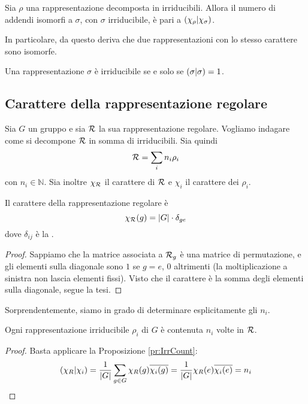 \begin{myprop}\label{pr:IrrCount}
  Sia $\rho$ una rappresentazione decomposta in irriducibili. Allora il numero di addendi isomorfi a $\sigma$, con $\sigma$ irriducibile, è pari a $\left(\chi_\rho | \chi_\sigma\right)$.
\end{myprop}

In particolare, da questo deriva che due rappresentazioni con lo stesso carattere sono isomorfe.

\begin{mytheorem}
  Una rappresentazione $\sigma$ è irriducibile se e solo se $\left(\sigma | \sigma\right)=1$.
\end{mytheorem}

\subsection{Carattere della rappresentazione regolare}
Sia $G$ un gruppo e sia $\mathcal R$ la sua rappresentazione regolare. Vogliamo indagare come si decompone $\mathcal R$ in somma di irriducibili. Sia quindi
\[
  \mathcal R = \sum_i n_i \rho_i
\]
con $n_i \in \mathbb N$. Sia inoltre $\chi_\mathcal R$ il carattere di $\mathcal R$ e $\chi_i$ il carattere dei $\rho_i$.
  
\begin{myprop}
  Il carattere della rappresentazione regolare è
  \[
  \chi_\mathcal R(g) = \left|G\right| \cdot \delta_{ge}
  \]
  dove $\delta_{ij}$ è la .
\end{myprop}

\begin{proof}
  Sappiamo che la matrice associata a $\mathcal R_g$ è una matrice di permutazione, e gli elementi sulla diagonale sono $1$ se $g=e$, $0$ altrimenti (la moltiplicazione a sinistra non lascia elementi fissi). Visto che il carattere è la somma degli elementi sulla diagonale, segue la tesi.
\end{proof}

Sorprendentemente, siamo in grado di determinare esplicitamente gli $n_i$.
\begin{myprop}
  Ogni rappresentazione irriducibile $\rho_i$ di $G$ è contenuta $n_i$ volte in $\mathcal R$.
\end{myprop}

\begin{proof}
  Basta applicare la Proposizione \ref{pr:IrrCount}:
  \[
  \left(\chi_R | \chi_i\right) = \frac1{\left|G\right|}\sum_{g\in G} \chi_R(g)\overline{\chi_i(g)} = \frac1{\left|G\right|}\chi_R(e)\overline{\chi_i(e)} = n_i
  \]

\end{proof}

